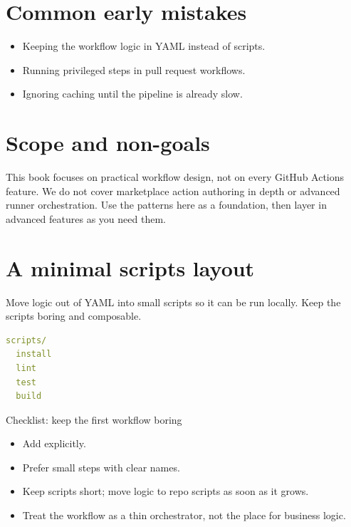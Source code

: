 \section{Common early mistakes}
\begin{itemize}[nosep]
  \item Keeping the workflow logic in YAML instead of scripts.
  \item Running privileged steps in pull request workflows.
  \item Ignoring caching until the pipeline is already slow.
\end{itemize}

\section{Scope and non-goals}
This book focuses on practical workflow design, not on every GitHub Actions feature.
We do not cover marketplace action authoring in depth or advanced runner orchestration.
Use the patterns here as a foundation, then layer in advanced features as you need them.

\section{A minimal scripts layout}
Move logic out of YAML into small scripts so it can be run locally.
Keep the scripts boring and composable.

\begin{lstlisting}[language=YAML]
scripts/
  install
  lint
  test
  build
\end{lstlisting}

\begin{checklistbox}{Checklist: keep the first workflow boring}
\begin{itemize}[nosep]
  \item Add  explicitly.
  \item Prefer small steps with clear names.
  \item Keep  scripts short; move logic to repo scripts as soon as it grows.
  \item Treat the workflow as a thin orchestrator, not the place for business logic.
\end{itemize}
\end{checklistbox}
